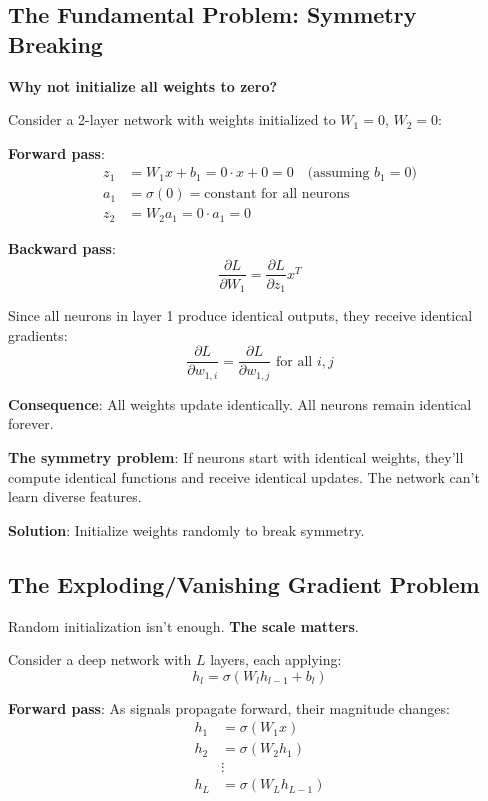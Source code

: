 \documentclass[11pt,oneside]{book}
\begin{document}
\subsection{The Fundamental Problem: Symmetry Breaking}

\textbf{Why not initialize all weights to zero?}

Consider a 2-layer network with weights initialized to $W_1 = 0$, $W_2 = 0$:

\textbf{Forward pass}:
\begin{align*}
z_1 &= W_1 x + b_1 = 0 \cdot x + 0 = 0 \quad \text{(assuming } b_1 = 0\text{)} \\
a_1 &= \sigma(0) = \text{constant for all neurons} \\
z_2 &= W_2 a_1 = 0 \cdot a_1 = 0
\end{align*}

\textbf{Backward pass}:
\[
\frac{\partial L}{\partial W_1} = \frac{\partial L}{\partial z_1} x^T
\]

Since all neurons in layer 1 produce identical outputs, they receive identical gradients:
\[
\frac{\partial L}{\partial w_{1,i}} = \frac{\partial L}{\partial w_{1,j}} \text{ for all } i, j
\]

\textbf{Consequence}: All weights update identically. All neurons remain identical forever.

\textbf{The symmetry problem}: If neurons start with identical weights, they'll compute identical functions and receive identical updates. The network can't learn diverse features.

\textbf{Solution}: Initialize weights randomly to break symmetry.

\subsection{The Exploding/Vanishing Gradient Problem}

Random initialization isn't enough. \textbf{The scale matters}.

Consider a deep network with $L$ layers, each applying:
\[
h_l = \sigma(W_l h_{l-1} + b_l)
\]

\textbf{Forward pass}: As signals propagate forward, their magnitude changes:
\begin{align*}
h_1 &= \sigma(W_1 x) \\
h_2 &= \sigma(W_2 h_1) \\
&\vdots \\
h_L &= \sigma(W_L h_{L-1})
\end{align*}
\end{document}
